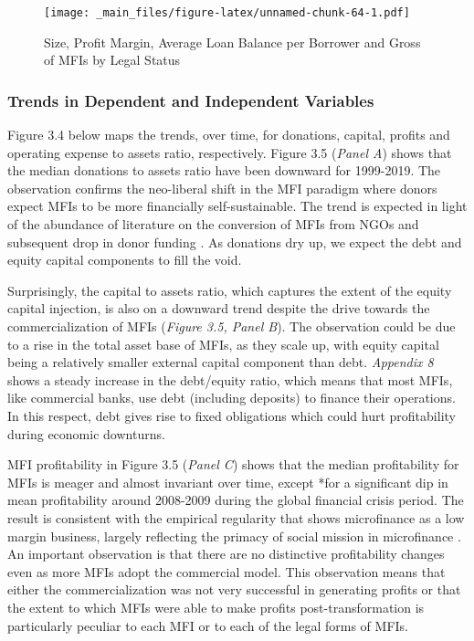 \documentclass[a4paper, nobind]{templates/ociamthesis}
\begin{document}
\newpage
\begin{landscape}

\begin{figure}
\centering
\texttt{[image: \_main\_files/figure-latex/unnamed-chunk-64-1.pdf]}
\caption{\label{fig:unnamed-chunk-64}Size, Profit Margin, Average Loan Balance per Borrower and Gross of MFIs by Legal Status}
\end{figure}

\end{landscape}
\newpage

\hypertarget{trends-in-dependent-and-independent-variables}{%
\subsubsection{Trends in Dependent and Independent Variables}\label{trends-in-dependent-and-independent-variables}}

Figure 3.4 below maps the trends, over time, for donations, capital, profits and operating expense to assets ratio, respectively. Figure 3.5 (\emph{Panel A}) shows that the median donations to assets ratio have been downward for 1999-2019. The observation confirms the neo-liberal shift in the MFI paradigm where donors expect MFIs to be more financially self-sustainable. The trend is expected in light of the abundance of literature on the conversion of MFIs from NGOs and subsequent drop in donor funding \autocite{d2017ngos}. As donations dry up, we expect the debt and equity capital components to fill the void.

Surprisingly, the capital to assets ratio, which captures the extent of the equity capital injection, is also on a downward trend despite the drive towards the commercialization of MFIs (\emph{Figure 3.5, Panel B}). The observation could be due to a rise in the total asset base of MFIs, as they scale up, with equity capital being a relatively smaller external capital component than debt. \emph{Appendix 8} shows a steady increase in the debt/equity ratio, which means that most MFIs, like commercial banks, use debt (including deposits) to finance their operations. In this respect, debt gives rise to fixed obligations which could hurt profitability during economic downturns.

MFI profitability in Figure 3.5 (\emph{Panel C}) shows that the median profitability for MFIs is meager and almost invariant over time, except *for a significant dip in mean profitability around 2008-2009 during the global financial crisis period. The result is consistent with the empirical regularity that shows microfinance as a low margin business, largely reflecting the primacy of social mission in microfinance \autocite{hartarska2012governance}. An important observation is that there are no distinctive profitability changes even as more MFIs adopt the commercial model. This observation means that either the commercialization was not very successful in generating profits or that the extent to which MFIs were able to make profits post-transformation is particularly peculiar to each MFI or to each of the legal forms of MFIs.
\end{document}
